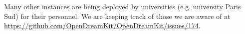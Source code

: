 \documentclass{deliverablereport}
\makeatletter
\renewcommand\subsubsection{\@startsection{subsubsection}{2}%
  \z@{.5\linespacing\@plus.7\linespacing}{.1\linespacing}%
  {\normalfont\bfseries}}
\makeatother
\begin{document}
Many other instances are being deployed by universities (e.g.
university Paris Sud) for their personnel. We are keeping track of
those we are aware of at
\url{https://github.com/OpenDreamKit/OpenDreamKit/issues/174}.







\end{document}

